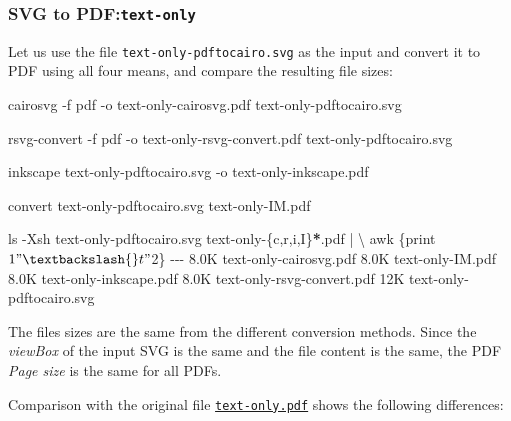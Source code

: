 \documentclass[
  11pt,
  british,
  a4paper,
]{article}
\newenvironment{Shaded}{\begin{snugshade}}{\end{snugshade}}
\newcommand{\AttributeTok}[1]{\textcolor[rgb]{0.80,0.80,0.80}{#1}}
\newcommand{\DataTypeTok}[1]{\textcolor[rgb]{0.87,0.87,0.75}{#1}}
\newcommand{\ExtensionTok}[1]{\textcolor[rgb]{0.80,0.80,0.80}{#1}}
\newcommand{\FunctionTok}[1]{\textcolor[rgb]{0.94,0.94,0.56}{#1}}
\newcommand{\KeywordTok}[1]{\textcolor[rgb]{0.94,0.87,0.69}{#1}}
\newcommand{\NormalTok}[1]{\textcolor[rgb]{0.80,0.80,0.80}{#1}}
\newcommand{\OperatorTok}[1]{\textcolor[rgb]{0.94,0.94,0.82}{#1}}
\newcommand{\PreprocessorTok}[1]{\textcolor[rgb]{1.00,0.81,0.69}{\textbf{#1}}}
\newcommand{\StringTok}[1]{\textcolor[rgb]{0.80,0.58,0.58}{#1}}
\begin{document}
\hypertarget{svg-to-pdftext-only}{%
\subsubsection{\texorpdfstring{SVG to
PDF:\texttt{text-only}}{SVG to PDF:text-only}}\label{svg-to-pdftext-only}}

Let us use the file \texttt{text-only-pdftocairo.svg} as the input and
convert it to PDF using all four means, and compare the resulting file
sizes:

\begin{Shaded}
\begin{Highlighting}[]
\ExtensionTok{cairosvg} \AttributeTok{{-}f}\NormalTok{ pdf }\AttributeTok{{-}o}\NormalTok{ text{-}only{-}cairosvg.pdf text{-}only{-}pdftocairo.svg}

\ExtensionTok{rsvg{-}convert} \AttributeTok{{-}f}\NormalTok{ pdf }\AttributeTok{{-}o}\NormalTok{ text{-}only{-}rsvg{-}convert.pdf text{-}only{-}pdftocairo.svg}

\ExtensionTok{inkscape}\NormalTok{ text{-}only{-}pdftocairo.svg }\AttributeTok{{-}o}\NormalTok{ text{-}only{-}inkscape.pdf}

\ExtensionTok{convert}\NormalTok{ text{-}only{-}pdftocairo.svg text{-}only{-}IM.pdf}

\FunctionTok{ls} \AttributeTok{{-}Xsh}\NormalTok{ text{-}only{-}pdftocairo.svg text{-}only{-}}\DataTypeTok{\{c}\OperatorTok{,}\DataTypeTok{r}\OperatorTok{,}\DataTypeTok{i}\OperatorTok{,}\DataTypeTok{I\}}\PreprocessorTok{*}\NormalTok{.pdf }\KeywordTok{|} \DataTypeTok{\textbackslash{}}
\FunctionTok{awk} \StringTok{\textquotesingle{}\{print $1 "\textbackslash{}t" $2\}\textquotesingle{}}
\ExtensionTok{{-}{-}{-}}
\ExtensionTok{8.0K}\NormalTok{    text{-}only{-}cairosvg.pdf}
\ExtensionTok{8.0K}\NormalTok{    text{-}only{-}IM.pdf}
\ExtensionTok{8.0K}\NormalTok{    text{-}only{-}inkscape.pdf}
\ExtensionTok{8.0K}\NormalTok{    text{-}only{-}rsvg{-}convert.pdf}
\ExtensionTok{12K}\NormalTok{     text{-}only{-}pdftocairo.svg}
\end{Highlighting}
\end{Shaded}

The files sizes are the same from the different conversion methods.
Since the \emph{viewBox} of the input SVG is the same and the file
content is the same, the PDF \emph{Page size} is the same for all PDFs.

Comparison with the original file
\href{images/text-only.pdf}{\texttt{text-only.pdf}} shows the following
differences:
\end{document}

